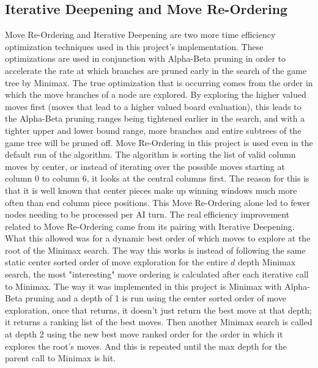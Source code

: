 \documentclass[conference]{IEEEtran}
\begin{document}
\subsection{Iterative Deepening and Move Re-Ordering}
Move Re-Ordering and Iterative Deepening are two more time efficiency optimization techniques used in this project's implementation. These optimizations are used in conjunction with Alpha-Beta pruning in order to accelerate the rate at which branches are pruned early in the search of the game tree by Minimax. The true optimization that is occurring comes from the order in which the move branches of a node are explored. By exploring the higher valued moves first (moves that lead to a higher valued board evaluation), this leads to the Alpha-Beta pruning ranges being tightened earlier in the search, and with a tighter upper and lower bound range, more branches and entire subtrees of the game tree will be pruned off. Move Re-Ordering in this project is used even in the default run of the algorithm. The algorithm is sorting the list of valid column moves by center, or instead of iterating over the possible moves starting at column 0 to column 6, it looks at the central columns first. The reason for this is that it is well known that center pieces make up winning windows much more often than end column piece positions. This Move Re-Ordering alone led to fewer nodes needing to be processed per AI turn. The real efficiency improvement related to Move Re-Ordering came from its pairing with Iterative Deepening. What this allowed was for a dynamic best order of which moves to explore at the root of the Minimax search. The way this works is instead of following the same static center sorted order of move exploration for the entire $d$ depth Minimax search, the most "interesting" move ordering is calculated after each iterative call to Minimax. The way it was implemented in this project is Minimax with Alpha-Beta pruning and a depth of 1 is run using the center sorted order of move exploration, once that returns, it doesn't just return the best move at that depth; it returns a ranking list of the best moves. Then another Minimax search is called at depth 2 using the new best move ranked order for the order in which it explores the root's moves. And this is repeated until the max depth for the parent call to Minimax is hit.
\end{document}
